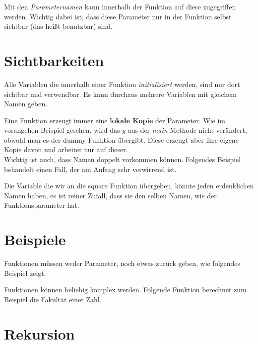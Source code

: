 \documentclass[c_worksheet.tex]{subfiles}
\begin{document}
 

Mit den \emph{Parameternamen} kann innerhalb der Funktion auf diese zugegriffen werden. Wichtig dabei ist, dass diese Parameter nur in der Funktion selbst sichtbar (das heißt benutzbar) sind.



\section{Sichtbarkeiten} 

Alle Variablen die innerhalb einer Funktion \emph{initialisiert} werden, sind nur dort sichtbar und verwendbar. Es kann durchaus mehrere Variablen mit gleichem Namen geben.

 

 Eine Funktion erzeugt immer eine \textbf{lokale Kopie} der Parameter. Wie im vorangehen Beispiel gesehen, wird das \(y\) aus der \emph{main} Methode nicht verändert, obwohl man es der dummy Funktion übergibt. Diese erzeugt aber ihre eigene Kopie davon und arbeitet nur auf dieser. \\

 Wichtig ist auch, dass Namen doppelt vorkommen können. Folgendes Beispiel behandelt einen Fall, der am Anfang sehr verwirrend ist.

  

Die Variable die wir an die square Funktion übergeben, könnte jeden erdenklichen Namen haben, es ist reiner Zufall, dass sie den selben Namen, wie der Funktionsparameter hat.



\section{Beispiele}

Funktionen müssen weder Parameter, noch etwas zurück geben, wie folgendes Beispiel zeigt.

  

Funktionen können beliebig komplex werden. Folgende Funktion berechnet zum Beispiel die Fakultät einer Zahl.

 



\section{Rekursion}
\end{document}
